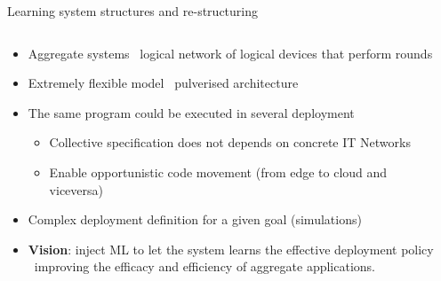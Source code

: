 \documentclass[8pt, aspectratio=169, handout]{beamer}
\begin{document}
\begin{frame}[allowframebreaks]{Learning system structures and re-structuring}
  \begin{columns}
    \begin{column}[c]{0.65\textwidth}
      \begin{cardTiny}
      \begin{itemize}
        \item Aggregate systems \faArrowRight \, logical network  of logical devices that perform rounds
        \item Extremely flexible model \faArrowRight \, pulverised architecture 
        \item The same program could be executed in several deployment
        \begin{itemize}
          \item Collective specification does not depends on concrete IT Networks
          \item Enable opportunistic code movement (from edge to cloud and viceversa)
        \end{itemize}
        \item[\failure{\faThumbsDown}] Complex deployment definition for a given goal (simulations)
        \item[\success{\faThumbsUp}] \textbf{Vision}: inject ML to let the system learns the effective deployment policy \faArrowRight \,  improving the efficacy and
        efficiency of aggregate applications.
      \end{itemize}
    \end{cardTiny}
  \end{column}
  \begin{column}[c]{0.3\textwidth}
  \end{column}
  \end{columns}
\end{frame}
\end{document}
